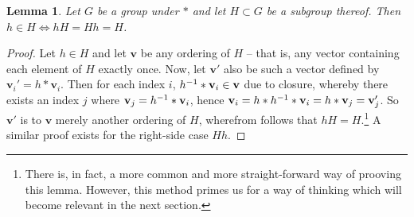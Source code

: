 \documentclass[a4paper,twoside,12pt,openany]{report}
\theoremstyle{plain}
\newtheorem{lemma}{Lemma}
\theoremstyle{definition}
\theoremstyle{remark}
\begin{document}
\begin{lemma}
	Let \(G\) be a group under \(*\) and let \(H\subset G\) be a subgroup thereof. Then \(h\in H \iff hH=Hh=H\).
\end{lemma}

\begin{proof}
	Let \(h\in H\) and let \(\mathbf{v}\) be any ordering of \(H\) -- that is, any vector containing each element of \(H\) exactly once. Now, let \(\mathbf{v}'\) also be such a vector defined by \(\mathbf{v}_i'=h*\mathbf{v}_i\).
	Then for each index \(i\), \(h^{-1}*\mathbf{v}_i\in \mathbf{v}\) due to closure, whereby there exists an index \(j\) where \(\mathbf{v}_j=h^{-1}*\mathbf{v}_i\), hence \(\mathbf{v}_i=h*h^{-1}*\mathbf{v}_i=h*\mathbf{v}_j=\mathbf{v}_j'\). So \(\mathbf{v}'\) is to \(\mathbf{v}\) merely another ordering of \(H\), wherefrom follows that \(hH = H\).\footnote{There is, in fact, a more common and more straight-forward way of prooving this lemma. However, this method primes us for a way of thinking which will become relevant in the next section.} A similar proof exists for the right-side case \(Hh\).
\end{proof}
\end{document}
